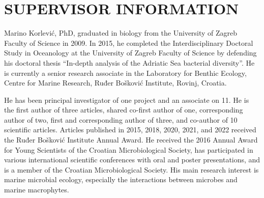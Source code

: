 \documentclass[
  12 pt,
]{book}
\begin{document}
\clearpage


\vspace*{0pt}


\hypertarget{supervisor-information}{%
\section*{SUPERVISOR INFORMATION}\label{supervisor-information}}

Marino Korlević, PhD, graduated in biology from the University of Zagreb Faculty of Science in 2009. In 2015, he completed the Interdisciplinary Doctoral Study in Oceanology at the University of Zagreb Faculty of Science by defending his doctoral thesis ``In-depth analysis of the Adriatic Sea bacterial diversity''. He is currently a senior research associate in the Laboratory for Benthic Ecology, Centre for Marine Research, Ruđer Bošković Institute, Rovinj, Croatia.

He has been principal investigator of one project and an associate on 11. He is the first author of three articles, shared co-first author of one, corresponding author of two, first and corresponding author of three, and co-author of 10 scientific articles. Articles published in 2015, 2018, 2020, 2021, and 2022 received the Ruđer Bošković Institute Annual Award. He received the 2016 Annual Award for Young Scientists of the Croatian Microbiological Society, has participated in various international scientific conferences with oral and poster presentations, and is a member of the Croatian Microbiological Society. His main research interest is marine microbial ecology, especially the interactions between microbes and marine macrophytes.

\clearpage


\vspace*{0pt}
\end{document}

